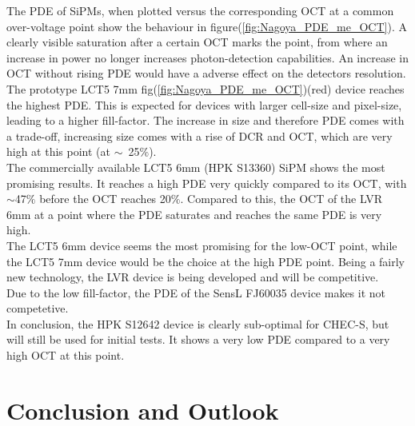 \documentclass[12pt,article,type=msc,colorback,accentcolor=tud9c]{tudthesis}
\begin{document}
The PDE of SiPMs, when plotted versus the corresponding OCT at a common over-voltage point show the behaviour in figure(\ref{fig:Nagoya_PDE_me_OCT}). A clearly visible saturation  after a certain OCT marks the point, from where an increase in power no longer increases photon-detection capabilities. An increase in OCT without rising PDE would have a adverse effect on the detectors resolution.\\
The prototype LCT5 7mm fig(\ref{fig:Nagoya_PDE_me_OCT})(red) device reaches the highest PDE. This is expected for devices with larger cell-size and pixel-size, leading to a higher fill-factor. The increase in size and therefore PDE comes with a trade-off, increasing size comes with a rise of DCR and OCT, which are very high at this point (at $\sim$~25$\%$).\\
The commercially available LCT5 6mm (HPK S13360) SiPM shows the most promising results. It reaches a high PDE very quickly compared to its OCT, with $\sim$47$\%$ before the OCT reaches 20$\%$. Compared to this, the OCT of the LVR 6mm at a point where the PDE saturates and reaches the same PDE is very high.\\
The LCT5 6mm device seems the most promising for the low-OCT point, while the LCT5 7mm device would be the choice at the high PDE point. Being a fairly new technology, the LVR device is being developed and will be competitive.\\
Due to the low fill-factor, the PDE of the SensL FJ60035 device makes it not competetive.\\
In conclusion, the HPK S12642 device is clearly sub-optimal for CHEC-S, but will still be used for initial tests. It shows a very low PDE compared to a very high OCT at this point.













\section{\Large Conclusion and Outlook}
\end{document}
